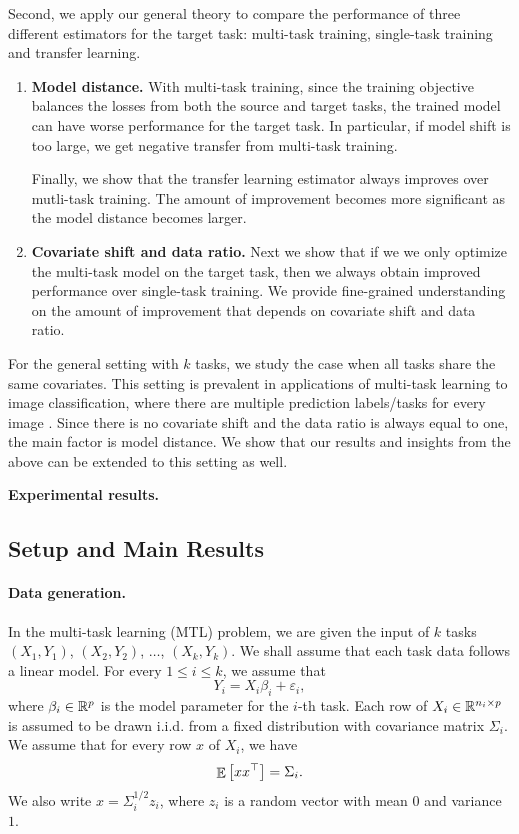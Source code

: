 \smallskip
{}
	Second, we apply our general theory to compare the performance of three different estimators for the target task: multi-task training, single-task training and transfer learning.
	\begin{enumerate}
		\item {\bf Model distance.} With multi-task training, since the training objective balances the losses from both the source and target tasks, the trained model can have worse performance for the target task.
	In particular, if model shift is too large, we get negative transfer from multi-task training.

	Finally, we show that the transfer learning estimator always improves over mutli-task training.
		The amount of improvement becomes more significant as the model distance becomes larger.
		\item {\bf Covariate shift and data ratio.} Next we show that if we we only optimize the multi-task model on the target task, then we always obtain improved performance over single-task training.
		We provide fine-grained understanding on the amount of improvement that depends on covariate shift and data ratio.
	\end{enumerate}

	For the general setting with $k$ tasks, we study the case when all tasks share the same covariates.
This setting is prevalent in applications of multi-task learning to image classification, where there are multiple prediction labels/tasks for every image \cite{EA20}.
	Since there is no covariate shift and the data ratio is always equal to one, the main factor is model distance.
	We show that our results and insights from the above can be extended to this setting as well.

\smallskip
\noindent\textbf{Experimental results.}

\subsection{Setup and Main Results}\label{sec_setup}

\paragraph{Data generation.}
In the multi-task learning (MTL) problem, we are given the input of $k$ tasks $(X_1, Y_1)$, $(X_2, Y_2)$, $\dots$, $(X_k, Y_k)$.
We shall assume that each task data follows a linear model.
For every $1\le i\le k$, we assume that
\[ Y_i = X_i \beta_i + \varepsilon_i, \]
where $\beta_i\in\mathbb{R}^p$ is the model parameter for the $i$-th task.
Each row of $X_i\in\mathbb{R}^{n_i\times p}$ is assumed to be drawn i.i.d. from a fixed distribution with covariance matrix $\Sigma_i$.
We assume that for every row $x$ of $X_i$, we have
\[ \mathop{\mathbb{E}}\left[ xx^{\top} \right] = \Sigma_i. \]
We also write $x = \Sigma_i^{1/2} z_i$, where $z_i$ is a random vector with mean $0$ and variance $1$.



